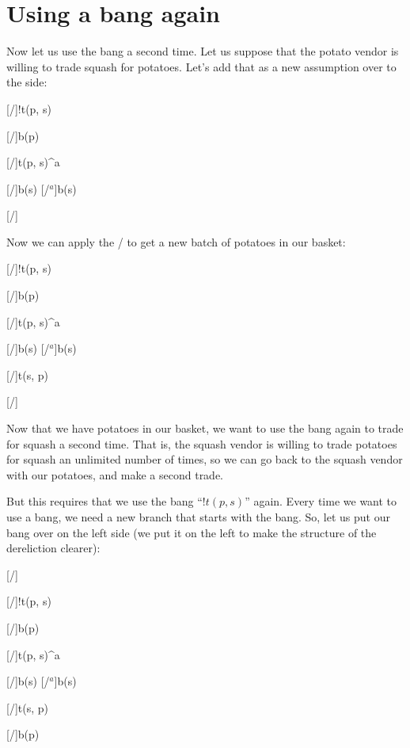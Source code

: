 \documentclass[../../../main.tex]{subfiles}
\begin{document}
\section{Using a bang again}

Now let us use the bang a second time. Let us suppose that the potato vendor is willing to trade squash for potatoes. Let's add that as a new assumption over to the side:

\begin{prooftree*}
  \hypo{}
  [\startrule/]{!t(p, s)}

  \hypo{}
  [\startrule/]{b(p)}

  \hypo{}
  [\startrule/]{t(p, s)^{a}}
  
  [\traderule/]{b(s)}
  [\bangDer/$^{a}$]{b(s)}

  \hypo{}
  [\startrule/]{}
  
\end{prooftree*}

\noindent
Now we can apply the \traderule/ to get a new batch of potatoes in our basket:

\begin{prooftree*}
  \hypo{}
  [\startrule/]{!t(p, s)}

  \hypo{}
  [\startrule/]{b(p)}

  \hypo{}
  [\startrule/]{t(p, s)^{a}}
  
  [\traderule/]{b(s)}
  [\bangDer/$^{a}$]{b(s)}

  \hypo{}
  [\startrule/]{t(s, p)}  
  
  [\traderule/]{}
\end{prooftree*}

\noindent
Now that we have potatoes in our basket, we want to use the bang again to trade for squash a second time. That is, the squash vendor is willing to trade potatoes for squash an unlimited number of times, so we can go back to the squash vendor with our potatoes, and make a second trade.

But this requires that we use the bang ``$!t(p, s)$'' again. Every time we want to use a bang, we need a new branch that starts with the bang. So, let us put our bang over on the left side (we put it on the left to make the structure of the dereliction clearer):

\begin{prooftree*}
  \hypo{}
  [\startrule/]{}

  \hypo{}
  [\startrule/]{!t(p, s)}

  \hypo{}
  [\startrule/]{b(p)}

  \hypo{}
  [\startrule/]{t(p, s)^{a}}
  
  [\traderule/]{b(s)}
  [\bangDer/$^{a}$]{b(s)}

  \hypo{}
  [\startrule/]{t(s, p)}  
  
  [\traderule/]{b(p)}

\end{prooftree*}
\end{document}
